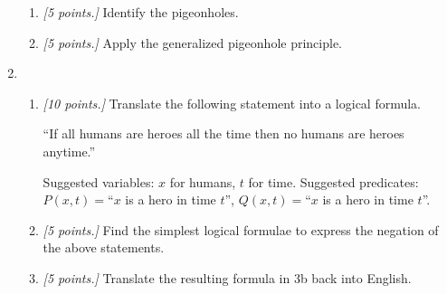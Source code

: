 \documentclass[12pt]{amsart}
\begin{document}
\begin{enumerate}[label=\arabic*.,itemsep=10pt, leftmargin=*]
\begin{enumerate}
            \item 
        \textit{[5 points.]}
            Identify the pigeonholes. 

            \item 
        \textit{[5 points.]}
            Apply the generalized pigeonhole principle.
        \end{enumerate}
    \item 
        \begin{enumerate}
            \item 
        \textit{[10 points.]}
            Translate the following statement into a logical formula.
                
                ``If all humans are heroes all the time then no humans are heroes anytime.''
                
            Suggested variables: $x$ for humans, 
            $t$ for time.
            Suggested predicates: 
            $P(x,t)=$``$x$ is a hero in time $t$'',
            $Q(x,t)=$``$x$ is a hero in time $t$''.
            

            \item 
        \textit{[5 points.]}
            Find the simplest logical formulae 
                to express the negation of the above statements. 
                
            \item
        \textit{[5 points.]}
            Translate the resulting formula in 3b back into English. 

        \end{enumerate}
\end{enumerate}
\end{document}
